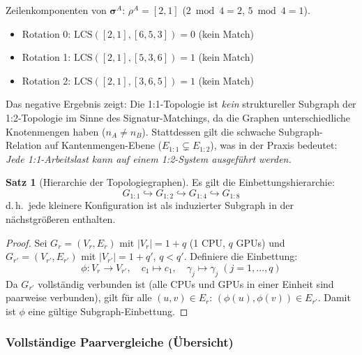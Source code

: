 ﻿\documentclass[a4paper,12pt]{article}
\theoremstyle{definition}
\newtheorem{satz}{Satz}
\begin{document}
Zeilenkomponenten von $\boldsymbol{\sigma}^A$:
$\rho^A = [2, 1]$
($2\bmod4=2$, $5\bmod4=1$).

\begin{itemize}
  \item Rotation 0: $\mathrm{LCS}([2,1],[6,5,3]) = 0$ \quad (kein Match)
  \item Rotation 1: $\mathrm{LCS}([2,1],[5,3,6]) = 1$ \quad (kein Match)
  \item Rotation 2: $\mathrm{LCS}([2,1],[3,6,5]) = 1$ \quad (kein Match)
\end{itemize}

Das negative Ergebnis zeigt: Die 1:1-Topologie ist \emph{kein} struktureller Subgraph
der 1:2-Topologie im Sinne des Signatur-Matchings, da die Graphen unterschiedliche
Knotenmengen haben ($n_A \neq n_B$). Stattdessen gilt die schwache Subgraph-Relation
auf Kantenmengen-Ebene ($E_{1:1} \subsetneq E_{1:2}$), was in der Praxis bedeutet:
\emph{Jede 1:1-Arbeitslast kann auf einem 1:2-System ausgef\"uhrt werden.}

\begin{satz}[Hierarchie der Topologiegraphen]
  \label{satz:hierarchie}
  Es gilt die Einbettungshierarchie:
  \[
    G_{1:1} \hookrightarrow G_{1:2} \hookrightarrow G_{1:4} \hookrightarrow G_{1:8}
  \]
  d.\,h.\ jede kleinere Konfiguration ist als induzierter Subgraph in der n\"achstgr\"o\ss eren enthalten.
\end{satz}

\begin{proof}
  Sei $G_r = (V_r, E_r)$ mit $|V_r| = 1 + q$ (1 CPU, $q$ GPUs) und
  $G_{r'} = (V_{r'}, E_{r'})$ mit $|V_{r'}| = 1 + q'$, $q < q'$.
  Definiere die Einbettung:
  \[
    \phi: V_r \to V_{r'}, \quad c_1 \mapsto c_1, \quad \gamma_j \mapsto \gamma_j\; (j=1,\ldots,q)
  \]
  Da $G_{r'}$ vollst\"andig verbunden ist (alle CPUs und GPUs in einer
  Einheit sind paarweise verbunden), gilt f\"ur alle $(u,v) \in E_r$:
  $(\phi(u),\phi(v)) \in E_{r'}$. Damit ist $\phi$ eine g\"ultige
  Subgraph-Einbettung. \qedhere
\end{proof}

\subsubsection{Vollst\"andige Paarvergleiche (\"Ubersicht)}
\end{document}
